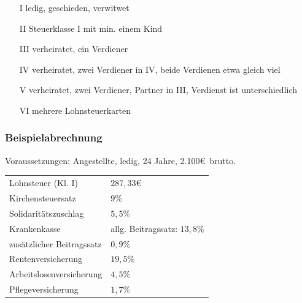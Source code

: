 \begin{itemize}
\setlength\itemsep{0em}
	\item[I]		ledig, geschieden, verwitwet
	\item[II]	Steuerklasse I mit min. einem Kind
	\item[III]	verheiratet, ein Verdiener
	\item[IV]	verheiratet, zwei Verdiener in IV, beide Verdienen etwa gleich viel
	\item[V]		verheiratet, zwei Verdiener, Partner in III, Verdienst ist unterschiedlich
	\item[VI]	mehrere Lohnsteuerkarten
\end{itemize}

\subsubsection{Beispielabrechnung}

Voraussetzungen: Angestellte, ledig, 24 Jahre, 2.100\euro\ brutto.\\
\begin{tabular}{ll}
Lohnsteuer (Kl. I)			& $287,33$\euro\\
Kirchensteuersatz 			& $9\%$\\
Solidaritätszuschlag			& $5,5\%$\\
Krankenkasse					& allg. Beitragssatz: $13,8\%$\\
zusätzlicher Beitragssatz	& $0,9\%$\\
Rentenversicherung			& $19,5\%$\\
Arbeitslosenversicherung		& $4,5\%$\\
Pflegeversicherung			& $1,7\%$\\
\end{tabular}\newline

